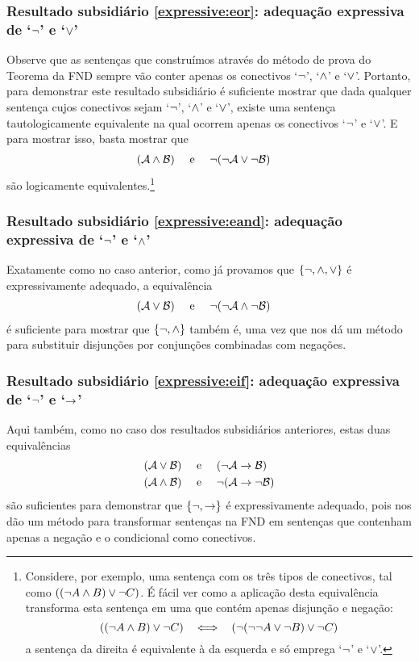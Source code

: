 \subsubsection{Resultado subsidiário \ref{expressive:eor}: adequação expressiva de `$\neg$' e `$\vee$'}	
Observe que as sentenças que construímos através do método de prova do Teorema da FND sempre vão conter apenas os conectivos `$\neg$', `$\wedge$' e `$\vee$'.
Portanto, para demonstrar este resultado subsidiário é suficiente mostrar que dada qualquer sentença cujos conectivos sejam `$\neg$', `$\wedge$' e `$\vee$', existe uma sentença tautologicamente equivalente na qual ocorrem apenas os conectivos `$\neg$' e `$\vee$'.
E para mostrar isso, basta mostrar que
		\begin{align*}
		(\mathcal{A} \wedge \mathcal{B}) & \text{\quad \ e \quad} \neg(\neg \mathcal{A} \vee\neg \mathcal{B})
		\end{align*}
		são logicamente equivalentes.\footnote{
			Considere, por exemplo, uma sentença com os três tipos de conectivos, tal como $((\neg A \wedge B) \vee \neg C)$.
			É fácil ver como a aplicação desta equivalência transforma esta sentença em uma que contém apenas disjunção e negação:
			$$((\enot A \eand B) \eor \enot C) \ \ \iff \ \ (\enot(\enot\enot A \eor\enot B) \eor \enot C)$$
			a sentença da direita é equivalente à da esquerda e só emprega `$\neg$' e `$\vee$'.}

\subsubsection{Resultado subsidiário \ref{expressive:eand}: adequação expressiva de `$\neg$' e `$\wedge$'}
Exatamente como no caso anterior, como já provamos que $\{ \neg, \wedge, \vee\}$ é expressivamente adequado, a equivalência 
		\begin{align*}
		(\mathcal{A} \vee \mathcal{B}) & \text{\quad \ e \quad}\neg(\neg \mathcal{A} \wedge\neg \mathcal{B})
		\end{align*}
é suficiente para mostrar que $\{ \neg, \wedge\}$ também é, uma vez que nos dá um método para substituir disjunções por conjunções combinadas com negações.

\subsubsection{Resultado subsidiário \ref{expressive:eif}: adequação expressiva de `$\neg$' e `$\rightarrow$'}
Aqui também, como no caso dos resultados subsidiários anteriores, estas duas equivalências 
		\begin{align*}
		(\mathcal{A} \vee \mathcal{B}) &\text{\quad \ e \quad} (\neg \mathcal{A} \rightarrow \mathcal{B})\\
		(\mathcal{A} \wedge \mathcal{B}) &\text{\quad \ e \quad} \neg(\mathcal{A} \rightarrow \neg\mathcal{B})
		\end{align*}
são suficientes para demonstrar que $\{ \neg, \rightarrow\}$ é expressivamente adequado, pois nos dão um método para transformar sentenças na FND em sentenças que contenham apenas a negação e o condicional como conectivos.

